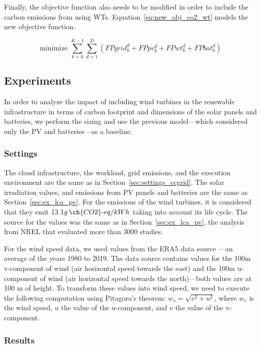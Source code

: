 Finally, the objective function also needs to be modified in order to include the carbon emissions from using WTs. Equation~\ref{eq:new_obj_co2_wt} models the new objective function.

\begin{equation} \label{eq:new_obj_co2_wt}
  \text{minimize }\sum_{k=0}^{K-1} \sum_{d=1}^D (FPgrid^d_k +  FPpv^d_k +  FPwt^d_k + FPbat^d_k) 
\end{equation}

\subsection{Experiments}

In order to analyze the impact of including wind turbines in the renewable infrastructure in terms of carbon footprint and dimensions of the solar panels and batteries, we perform the sizing and use the previous model---which considered only the PV and batteries---as a baseline.

\subsubsection{Settings}
\label{sec:settings_wt}

The cloud infrastructure, the workload, grid emissions, and the execution environment are the same as in Section~\ref{sec:settings_ccgrid}. The solar irradiation values, and emissions from PV panels and batteries are the same as Section~\ref{sec:ex_lca_pv}. For the  emissions of the wind turbines, it is considered that they emit 13 $1g\,\ch{CO2}\text{-}eq/kWh$ taking into account its life cycle. The source for the values was the same as in Section~\ref{sec:ex_lca_pv}, the analysis from NREL that evaluated more than 3000 studies.

For the wind speed data, we used values from the ERA5 data source \cite{era5_wind_2022}---an average of the years 1980 to 2019. The data source contains values for the 100m v-component of wind (air horizontal speed towards the east) and the 100m u-component of wind (air horizontal speed towards the north)---both values are at 100 m of height. To transform these values into wind speed, we need to execute the following computation using Pitagora's theorem: $ w_s = \sqrt{ v^2 + u^2} $, where $w_s$ is the wind speed, $u$ the value of the u-component, and $v$ the value of the v-component.
\subsubsection{Results}
\label{sec:results_wt}

